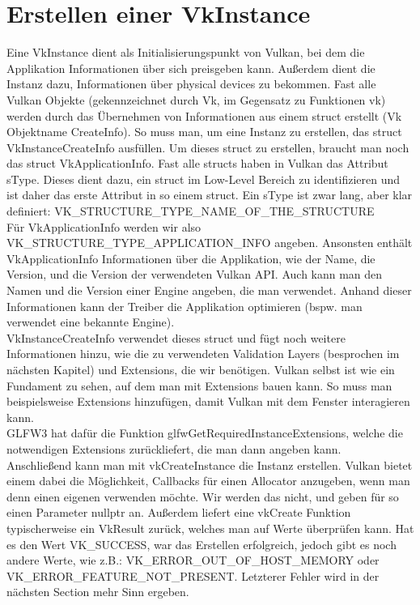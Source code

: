 \documentclass[11pt,a4paper]{report}
\begin{document}
\section{Erstellen einer VkInstance}
Eine VkInstance dient als Initialisierungspunkt von Vulkan, bei dem die Applikation Informationen über sich preisgeben kann. Außerdem dient die Instanz dazu, Informationen über physical devices zu bekommen. Fast alle Vulkan Objekte (gekennzeichnet durch Vk, im Gegensatz zu Funktionen vk) werden durch das Übernehmen von Informationen aus einem struct erstellt (Vk Objektname CreateInfo). So muss man, um eine Instanz zu erstellen, das struct VkInstanceCreateInfo ausfüllen. Um dieses struct zu erstellen, braucht man noch das struct VkApplicationInfo.
Fast alle structs haben in Vulkan das Attribut sType. Dieses dient dazu, ein struct im Low-Level Bereich zu identifizieren und ist daher das erste Attribut in so einem struct. Ein sType ist zwar lang, aber klar definiert: VK\_STRUCTURE\_TYPE\_NAME\_OF\_THE\_STRUCTURE\\
Für VkApplicationInfo werden wir also VK\_STRUCTURE\_TYPE\_APPLICATION\_INFO angeben.
Ansonsten enthält VkApplicationInfo Informationen über die Applikation, wie der Name, die Version, und die Version der verwendeten Vulkan API. Auch kann man den Namen und die Version einer Engine angeben, die man verwendet. Anhand dieser Informationen kann der Treiber die Applikation optimieren (bspw. man verwendet eine bekannte Engine).\\
VkInstanceCreateInfo verwendet dieses struct und fügt noch weitere Informationen hinzu, wie die zu verwendeten Validation Layers (besprochen im nächsten Kapitel) und Extensions, die wir benötigen. Vulkan selbst ist wie ein Fundament zu sehen, auf dem man mit Extensions bauen kann. So muss man beispielsweise Extensions hinzufügen, damit Vulkan mit dem Fenster interagieren kann.\\GLFW3 hat dafür die Funktion glfwGetRequiredInstanceExtensions, welche die notwendigen Extensions zurückliefert, die man dann angeben kann.\\
Anschließend kann man mit vkCreateInstance die Instanz erstellen. Vulkan bietet einem dabei die Möglichkeit, Callbacks für einen Allocator anzugeben, wenn man denn einen eigenen verwenden möchte. Wir werden das nicht, und geben für so einen Parameter nullptr an. Außerdem liefert eine vkCreate Funktion typischerweise ein VkResult zurück, welches man auf Werte überprüfen kann. Hat es den Wert VK\_SUCCESS, war das Erstellen erfolgreich, jedoch gibt es noch andere Werte, wie z.B.: VK\_ERROR\_OUT\_OF\_HOST\_MEMORY oder VK\_ERROR\_FEATURE\_NOT\_PRESENT. Letzterer Fehler wird in der nächsten Section mehr Sinn ergeben.
\end{document}
